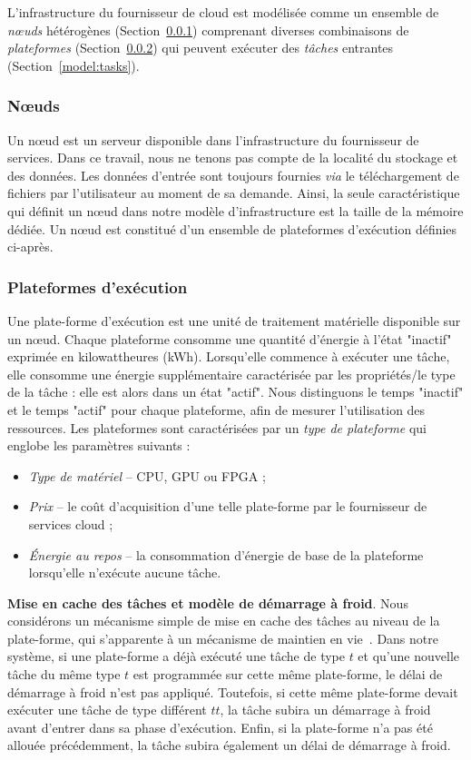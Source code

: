 L'infrastructure du fournisseur de cloud est modélisée comme un ensemble de \textit{nœuds} hétérogènes (Section~\ref{model:nodes}) comprenant diverses combinaisons de \textit{plateformes} (Section~\ref{model:platforms}) qui peuvent exécuter des \textit{tâches} entrantes (Section~\ref{model:tasks}). 

\subsubsection{Nœuds}
\label{model:nodes}
Un nœud est un serveur disponible dans l'infrastructure du fournisseur de services. Dans ce travail, nous ne tenons pas compte de la localité du stockage et des données. Les données d'entrée sont toujours fournies \textit{via} le téléchargement de fichiers par l'utilisateur au moment de sa demande.
Ainsi, la seule caractéristique qui définit un nœud dans notre modèle d'infrastructure est la taille de la mémoire dédiée. Un nœud est constitué d'un ensemble de plateformes d'exécution définies ci-après.

\subsubsection{Plateformes d'exécution}
\label{model:platforms}

Une plate-forme d'exécution est une unité de traitement matérielle disponible sur un nœud. Chaque plateforme consomme une quantité d'énergie à l'état "inactif" exprimée en kilowattheures (kWh). Lorsqu'elle commence à exécuter une tâche, elle consomme une énergie supplémentaire caractérisée par les propriétés/le type de la tâche : elle est alors dans un état "actif". Nous distinguons le temps "inactif" et le temps "actif" pour chaque plateforme, afin de mesurer l'utilisation des ressources.
Les plateformes sont caractérisées par un \textit{type de plateforme} qui englobe les paramètres suivants :

\begin{itemize}
    \item \textit{Type de matériel} -- CPU, GPU ou FPGA ;
    \item \textit{Prix} -- le coût d'acquisition d'une telle plate-forme par le fournisseur de services cloud ;
    \item \textit{Énergie au repos} -- la consommation d'énergie de base de la plateforme lorsqu'elle n'exécute aucune tâche.
\end{itemize}

\textbf{Mise en cache des tâches et modèle de démarrage à froid}. Nous considérons un mécanisme simple de mise en cache des tâches au niveau de la plate-forme, qui s'apparente à un mécanisme de maintien en vie~\cite{7279063}. Dans notre système, si une plate-forme a déjà exécuté une tâche de type $t$ et qu'une nouvelle tâche du même type $t$ est programmée sur cette même plate-forme, le délai de démarrage à froid n'est pas appliqué. Toutefois, si cette même plate-forme devait exécuter une tâche de type différent $tt$, la tâche subira un démarrage à froid avant d'entrer dans sa phase d'exécution. Enfin, si la plate-forme n'a pas été allouée précédemment, la tâche subira également un délai de démarrage à froid.

